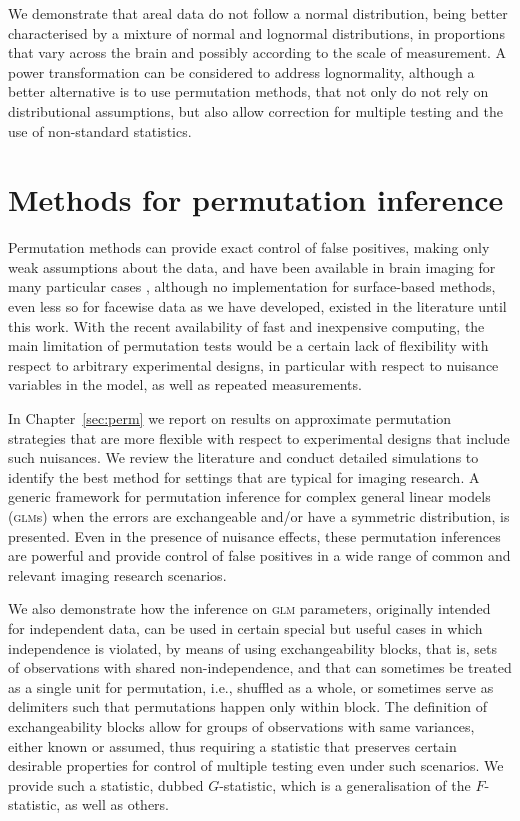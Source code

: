 We demonstrate that areal data do not follow a normal distribution, being better characterised by a mixture of normal and lognormal distributions, in proportions that vary across the brain and possibly according to the scale of measurement. A power transformation can be considered to address lognormality, although a better alternative is to use permutation methods, that not only do not rely on distributional assumptions, but also allow correction for multiple testing and the use of non-standard statistics.

\section{Methods for permutation inference}

Permutation methods can provide exact control of false positives, making only weak assumptions about the data, and have been available in brain imaging for many particular cases \citep{Holmes1996, Nichols2002}, although no implementation for surface-based methods, even less so for facewise data as we have developed, existed in the literature until this work. With the recent availability of fast and inexpensive computing, the main limitation of permutation tests would be a certain lack of flexibility with respect to arbitrary experimental designs, in particular with respect to nuisance variables in the model, as well as repeated measurements. 

In Chapter~\ref{sec:perm} we report on results on approximate permutation strategies that are more flexible with respect to experimental designs that include such nuisances. We review the literature and conduct detailed simulations to identify the best method for settings that are typical for imaging research. A generic framework for permutation inference for complex general linear models (\textsc{glm}s) when the errors are exchangeable and/or have a symmetric distribution, is presented. Even in the presence of nuisance effects, these permutation inferences are powerful and provide control of false positives in a wide range of common and relevant imaging research scenarios.

We also demonstrate how the inference on \textsc{glm} parameters, originally intended for independent data, can be used in certain special but useful cases in which independence is violated, by means of using exchangeability blocks, that is, sets of observations with shared non-independence, and that can sometimes be treated as a single unit for permutation, i.e., shuffled as a whole, or sometimes serve as delimiters such that permutations happen only within block. The definition of exchangeability blocks allow for groups of observations with same variances, either known or assumed, thus requiring a statistic that preserves certain desirable properties for control of multiple testing even under such scenarios. We provide such a statistic, dubbed $G$-statistic, which is a generalisation of the $F$-statistic, as well as others.

